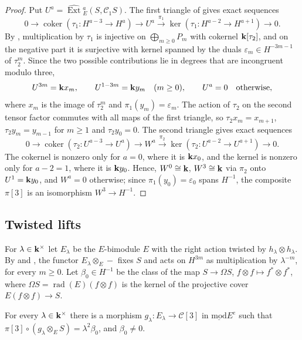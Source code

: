 \begin{proof}
  Put ${U^a=\widehat{\operatorname{Ext}}{}^a_E(S,\mathcal{C}_1S)}$. The first
  triangle of  gives exact sequences
  \[
    0\longrightarrow\operatorname{coker}(\tau_1\colon H^{a-3}\to H^a)
    \longrightarrow U^a\xrightarrow{\pi_1}\ker(\tau_1\colon H^{a-2}\to
    H^{a+1})\longrightarrow0.
  \]
  By , multiplication by $\tau_1$ is injective
  on $\bigoplus_{m\geq0}P_m$ with cokernel $\mathbf{k}[\tau_2]$, and on the negative
  part it is surjective with kernel spanned by the duals
  ${\varepsilon_m\in H^{-3m-1}}$ of $\tau_2^m$. Since the two possible
  contributions lie in degrees that are incongruent modulo three,
  \[
    U^{3m}=\mathbf{k} x_m,\qquad U^{1-3m}=\mathbf{k} y_m\quad(m\geq0),\qquad
    U^a=0\quad\text{otherwise},
  \]
  where $x_m$ is the image of $\tau_2^m$ and ${\pi_1(y_m)=\varepsilon_m}$. The
  action of $\tau_2$ on the second tensor factor commutes with all maps of the
  first triangle,
  so ${\tau_2x_m=x_{m+1}}$, ${\tau_2y_m=y_{m-1}}$ for ${m\geq1}$ and ${\tau_2y_0=0}$.
  The second triangle gives exact sequences
  \[
    0\longrightarrow\operatorname{coker}(\tau_2\colon U^{a-3}\to U^a)
    \longrightarrow W^a\xrightarrow{\pi_2}\ker(\tau_2\colon U^{a-2}\to
    U^{a+1})\longrightarrow0.
  \]
  The cokernel is nonzero only for ${a=0}$, where it is $\mathbf{k} x_0$, and the kernel
  is nonzero only for ${a-2=1}$, where it is $\mathbf{k} y_0$. Hence, ${W^0\cong\mathbf{k}}$,
  ${W^3\cong\mathbf{k}}$ via $\pi_2$ onto ${U^1=\mathbf{k} y_0}$, and ${W^a=0}$ otherwise; since
  ${\pi_1(y_0)=\varepsilon_0}$ spans $H^{-1}$, the composite $\pi[3]$ is an
  isomorphism ${W^3\to H^{-1}}$.
\end{proof}

\subsection{Twisted lifts}
\label{subsec:lifts}

For ${\lambda\in\mathbf{k}^\times}$ let $E_\lambda$ be the $E$-bimodule $E$ with the
right action twisted by ${h_\lambda\otimes h_\lambda}$. By 
and , the functor ${E_\lambda\otimes_E-}$ fixes $S$ and acts on
$H^{3m}$ as multiplication by $\lambda^{-m}$, for every ${m\geq0}$. Let
${\beta_0\in H^{-1}}$ be the class of the map ${S\to\Omega S}$,
${f\otimes f\mapsto f^*\otimes f^*}$, where ${\Omega S=\operatorname{rad}(E)
(f\otimes f)}$ is the kernel of the projective cover ${E(f\otimes f)\to S}$.

\begin{proposition}
  \label{prop:lifts}
  For every ${\lambda\in\mathbf{k}^\times}$ there is a morphism ${g_\lambda\colon
  E_\lambda\to\mathcal{C}[3]}$ in $\operatorname{\underline{mod}}E^e$ such that
  ${\pi[3]\circ(g_\lambda\otimes_ES)=\lambda^2\beta_0}$, and ${\beta_0\neq0}$.
\end{proposition}

